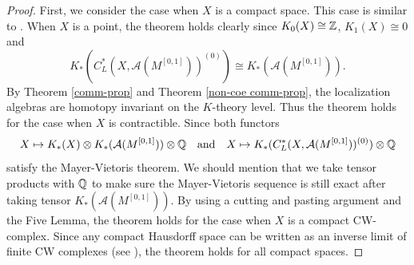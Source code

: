 \documentclass[11pt]{article}
\theoremstyle{definition}
\theoremstyle{plain}
\def\A{\mathcal A}\def\C{\mathcal C}\def\B{\mathcal B}\def\E{\mathcal E}\def\O{\mathcal O}\def\h{\mathfrak h}\def\K{\mathcal K}\def\F{\mathcal F}\def\P{\mathcal P}\def\L{\mathcal L}\def\R{\mathcal R}\def\Q{\mathcal Q}\def\H{\mathcal H}\def\S{\mathcal S}\def\N{\mathcal N}\def\U{\mathcal U}\def\V{\mathcal V}
\def\ox{\otimes}
\def\ox{\otimes}
\begin{document}
\begin{appendices}
\begin{proof}
First, we consider the case when $X$ is a compact space. This case is similar to \cite[Lemma 2.4]{GWY2018}. When $X$ is a point, the theorem holds clearly since $K_0(X)\cong\mathbb Z$, $K_1(X)\cong 0$ and
$$K_*(C^*_L(X,\A(M^{[0,1]}))^{(0)})\cong K_*(\A(M^{[0,1]})).$$
By Theorem \ref{comm-prop} and Theorem \ref{non-coe comm-prop}, the localization algebras are homotopy invariant on the $K$-theory level. Thus the theorem holds for the case when $X$ is contractible. Since both functors
$$X\mapsto K_*(X)\ox K_*(\A(M^{[0,1]}))\ox\IQ\quad\text{and}\quad X\mapsto K_*(C^*_L(X,\A(M^{[0,1]}))^{(0)})\ox\IQ$$
satisfy the Mayer-Vietoris theorem. We should mention that we take tensor products with $\mathbb Q$ to make sure the Mayer-Vietoris sequence is still exact after taking tensor $K_*(\A(M^{[0,1]}))$. By using a cutting and pasting argument and the Five Lemma, the theorem holds for the case when $X$ is a compact CW-complex. Since any compact Hausdorff space can be written as an inverse limit of finite CW complexes (see \cite[Theorem X.10.1]{fundaofalgtop}), the theorem holds for all compact spaces.


\end{proof}
\end{appendices}
\end{document}
